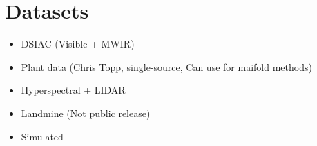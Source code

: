 \documentclass{article}[10 pt]
\begin{document}
\section*{Datasets}
\begin{itemize}
	\item DSIAC (Visible + MWIR)
	\item Plant data (Chris Topp, single-source, Can use for maifold methods)
	\item Hyperspectral + LIDAR
	\item Landmine (Not public release)
	\item Simulated
\end{itemize}








\end{document}
